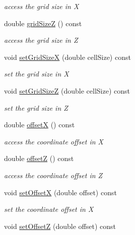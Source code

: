 \begin{DoxyCompactItemize}
\begin{DoxyCompactList}\small\item\em access the grid size in X \end{DoxyCompactList}\item 
double \hyperlink{class_d_d4hep_1_1_geometry_1_1_cartesian_grid_x_z_a2a9f3d650000f7bdc2ccf91ce7b9e2cd}{grid\+SizeZ} () const
\begin{DoxyCompactList}\small\item\em access the grid size in Z \end{DoxyCompactList}\item 
void \hyperlink{class_d_d4hep_1_1_geometry_1_1_cartesian_grid_x_z_a654091b4f1c548a47490848d2434b939}{set\+Grid\+SizeX} (double cell\+Size) const
\begin{DoxyCompactList}\small\item\em set the grid size in X \end{DoxyCompactList}\item 
void \hyperlink{class_d_d4hep_1_1_geometry_1_1_cartesian_grid_x_z_aa2e1ab729fa67a539e9542d711a7381a}{set\+Grid\+SizeZ} (double cell\+Size) const
\begin{DoxyCompactList}\small\item\em set the grid size in Z \end{DoxyCompactList}\item 
double \hyperlink{class_d_d4hep_1_1_geometry_1_1_cartesian_grid_x_z_ac19b3c707b7fe23d04c9e1615ba20158}{offsetX} () const
\begin{DoxyCompactList}\small\item\em access the coordinate offset in X \end{DoxyCompactList}\item 
double \hyperlink{class_d_d4hep_1_1_geometry_1_1_cartesian_grid_x_z_a1d344c9a547a3c77b90b6ea58f06ff8d}{offsetZ} () const
\begin{DoxyCompactList}\small\item\em access the coordinate offset in Z \end{DoxyCompactList}\item 
void \hyperlink{class_d_d4hep_1_1_geometry_1_1_cartesian_grid_x_z_ac17d9d05aa52b82b9e0a864a94b1fd57}{set\+OffsetX} (double offset) const
\begin{DoxyCompactList}\small\item\em set the coordinate offset in X \end{DoxyCompactList}\item 
void \hyperlink{class_d_d4hep_1_1_geometry_1_1_cartesian_grid_x_z_a94b1655c1d03dd377a04151350aeacbd}{set\+OffsetZ} (double offset) const

\end{DoxyCompactItemize}
